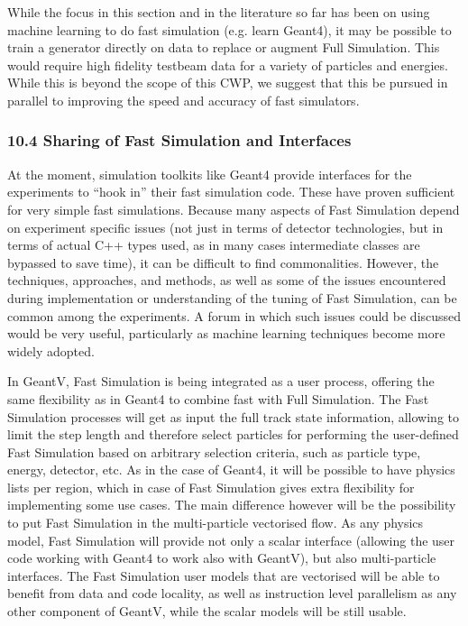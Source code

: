 \documentclass[12pt,a4paper]{article}
\begin{document}
While the focus in this section and in the literature so far has been on
using machine learning to do fast simulation (e.g. learn Geant4), it may
be possible to train a generator directly on data to replace or augment
Full Simulation. This would require high fidelity testbeam data for a
variety of particles and energies. While this is beyond the scope of
this CWP, we suggest that this be pursued in parallel to improving the
speed and accuracy of fast simulators.

\hypertarget{sharing-of-fast-simulation-and-interfaces}{%
\subsubsection{10.4 Sharing of Fast Simulation and
Interfaces}\label{sharing-of-fast-simulation-and-interfaces}}

At the moment, simulation toolkits like Geant4 provide interfaces for
the experiments to ``hook in'' their fast simulation code. These have
proven sufficient for very simple fast simulations. Because many aspects
of Fast Simulation depend on experiment specific issues (not just in
terms of detector technologies, but in terms of actual C++ types used,
as in many cases intermediate classes are bypassed to save time), it can
be difficult to find commonalities. However, the techniques, approaches,
and methods, as well as some of the issues encountered during
implementation or understanding of the tuning of Fast Simulation, can be
common among the experiments. A forum in which such issues could be
discussed would be very useful, particularly as machine learning
techniques become more widely adopted.

In GeantV, Fast Simulation is being integrated as a user process,
offering the same flexibility as in Geant4 to combine fast with Full
Simulation. The Fast Simulation processes will get as input the full
track state information, allowing to limit the step length and therefore
select particles for performing the user-defined Fast Simulation based
on arbitrary selection criteria, such as particle type, energy,
detector, etc. As in the case of Geant4, it will be possible to have
physics lists per region, which in case of Fast Simulation gives extra
flexibility for implementing some use cases. The main difference however
will be the possibility to put Fast Simulation in the multi-particle
vectorised flow. As any physics model, Fast Simulation will provide not
only a scalar interface (allowing the user code working with Geant4 to
work also with GeantV), but also multi-particle interfaces. The Fast
Simulation user models that are vectorised will be able to benefit from
data and code locality, as well as instruction level parallelism as any
other component of GeantV, while the scalar models will be still usable.
\end{document}
